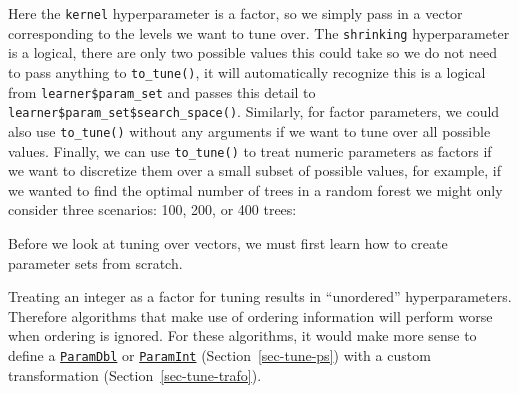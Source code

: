 Here the \texttt{kernel} hyperparameter is a factor, so we simply pass
in a vector corresponding to the levels we want to tune over. The
\texttt{shrinking} hyperparameter is a logical, there are only two
possible values this could take so we do not need to pass anything to
\texttt{to\_tune()}, it will automatically recognize this is a logical
from \texttt{learner\$param\_set} and passes this detail to
\texttt{learner\$param\_set\$search\_space()}. Similarly, for factor
parameters, we could also use \texttt{to\_tune()} without any arguments
if we want to tune over all possible values. Finally, we can use
\texttt{to\_tune()} to treat numeric parameters as factors if we want to
discretize them over a small subset of possible values, for example, if
we wanted to find the optimal number of trees in a random forest we
might only consider three scenarios: 100, 200, or 400 trees:

\begin{Shaded}
\begin{Highlighting}[]
\NormalTok{(}\NormalTok{, } \NormalTok{(}\NormalTok{(}\NormalTok{, }\NormalTok{, }\NormalTok{)))}
\end{Highlighting}
\end{Shaded}

Before we look at tuning over vectors, we must first learn how to create
parameter sets from scratch.

\begin{tcolorbox}[enhanced jigsaw, opacitybacktitle=0.6, rightrule=.15mm, opacityback=0, arc=.35mm, breakable, titlerule=0mm, colframe=quarto-callout-warning-color-frame, coltitle=black, bottomrule=.15mm, toprule=.15mm, colback=white, colbacktitle=quarto-callout-warning-color!10!white, bottomtitle=1mm, toptitle=1mm, title=\textcolor{quarto-callout-warning-color}{\faExclamationTriangle}\hspace{0.5em}{Ordered Hyperparameters}, leftrule=.75mm, left=2mm]

Treating an integer as a factor for tuning results in ``unordered''
hyperparameters. Therefore algorithms that make use of ordering
information will perform worse when ordering is ignored. For these
algorithms, it would make more sense to define a
\href{https://paradox.mlr-org.com/reference/ParamDbl.html}{\texttt{ParamDbl}}
or
\href{https://paradox.mlr-org.com/reference/ParamInt.html}{\texttt{ParamInt}}
(Section~\ref{sec-tune-ps}) with a custom transformation
(Section~\ref{sec-tune-trafo}).

\end{tcolorbox}

